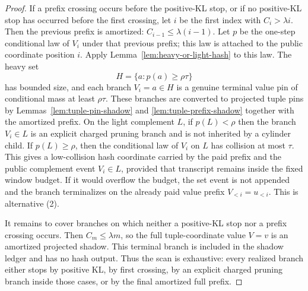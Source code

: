 \documentclass[11pt]{article}
\begin{document}
\begin{proof}
If a prefix crossing occurs before the positive-KL stop, or if no positive-KL
stop has occurred before the first crossing, let $i$ be the first index with
$C_i>\lambda i$.  Then the previous prefix is amortized:
$C_{i-1}\le\lambda(i-1)$.  Let $p$ be the one-step conditional law of $V_i$
under that previous prefix; this law is attached to the public coordinate
position $i$.  Apply Lemma~\ref{lem:heavy-or-light-hash} to this law.  The
heavy set
\[
  H=\{a:p(a)\ge\rho\tau\}
\]
has bounded size, and each branch $V_i=a\in H$ is a genuine terminal value pin
of conditional mass at least $\rho\tau$.  These branches are converted to
projected tuple pins by Lemmas~\ref{lem:tuple-pin-shadow} and
\ref{lem:tuple-prefix-shadow} together with the amortized prefix.  On the
light complement $L$, if $p(L)<\rho$ then the branch $V_i\in L$ is an explicit
charged pruning branch and is not inherited by a cylinder child.  If
$p(L)\ge\rho$, then the conditional law of $V_i$ on $L$ has collision at most
$\tau$.  This gives a low-collision hash coordinate carried by the paid prefix
and the public complement event $V_i\in L$, provided that transcript remains
	inside the fixed window budget.  If it would overflow the budget, the set event
	is not appended and the branch terminalizes on the already paid value prefix
	$V_{<i}=u_{<i}$.  This is alternative (2).

It remains to cover branches on which neither a positive-KL stop nor a prefix
crossing occurs.  Then $C_m\le\lambda m$, so the full tuple-coordinate value
$V=v$ is an amortized projected shadow.  This terminal branch is included in the
shadow ledger and has no hash output.  Thus the scan is exhaustive: every
realized branch either stops by positive KL, by first crossing, by an explicit
charged pruning branch inside those cases, or by the final amortized full
prefix.
\end{proof}
\end{document}
